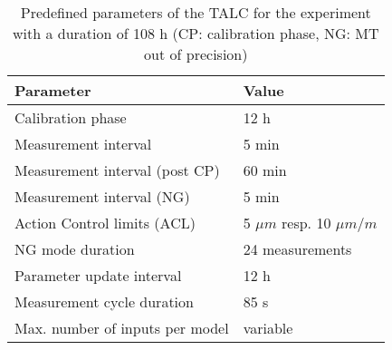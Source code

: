 \begin{table}[!htb]
\centering
\begin{threeparttable}
\caption[Experiment parameters]{Predefined parameters of the TALC for the experiment with a duration of 108 h (CP: calibration phase, NG: MT out of precision)}
\begin{tabular}{l l}
\hline
Parameter \hspace{7cm} & Value\\
  \hline
 Calibration phase & 12 h\\
 Measurement interval & 5 min\\
 Measurement interval (post CP) & 60 min\\
 Measurement interval (NG) & 5 min\\
 Action Control limits (ACL) & 5 $\mu m$ resp. 10 $\mu m/m$\\
 NG mode duration & 24 measurements\\
 Parameter update interval & 12 h\\
 Measurement cycle duration & 85 s\\
 Max. number of inputs per model & variable\\
\hline
\end{tabular}
\label{Tab:Experimental_setup}
\end{threeparttable}
\end{table}



